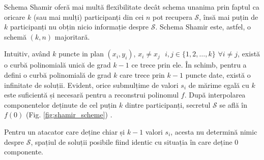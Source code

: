 \documentclass[oneside, 12pt]{book}
\begin{document}
Schema Shamir oferă mai multă flexibilitate decât schema unanima prin faptul ca oricare $k$ (sau mai mulți) participanți
din cei $n$ pot recupera $\mathcal{S}$, însă mai puțin de $k$ participanți nu obțin nicio informație despre $\mathcal{S}$. Schema Shamir este, astfel, o schemă $(k,n)$ majoritară.

Intuitiv, având $k$ puncte in plan $(x_i, y_i)$, $x_i \neq x_j \text{ } i,j \in \{1,2,\dots,k\}$ $\forall i \neq j$, există o curbă polinomială unică de grad $k - 1$ ce trece prin ele.  
În schimb, pentru a defini o curbă polinomială de grad $k$ care trece prin $k - 1$ puncte date, există o infinitate de soluții.
Evident, orice submulțime de valori $s_i$ de mărime egală cu $k$ este suficientă și necesară pentru a reconstrui polinomul $f$. După interpolarea componentelor deținute de cel puțin $k$ dintre participanți, secretul $\mathcal{S}$ se află în $f(0)$ (Fig. \ref{fig:shamir_scheme}) \cite{S:1979}.

Pentru un atacator care deține chiar și $k-1$ valori $s_i$, acesta nu determină nimic despre $\mathcal{S}$, spațiul de soluții posibile fiind identic cu situația în care deține $0$ componente.
\end{document}
